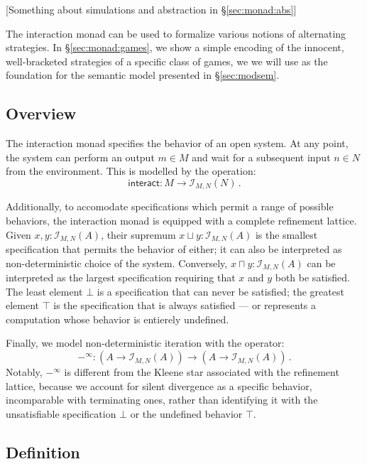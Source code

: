 \documentclass[acmsmall,timestamp,review]{acmart}
\newcommand{\kw}[1]{\ensuremath{ \mathsf{#1} }}
\begin{document}
[Something about simulations and abstraction in \S\ref{sec:monad:abs}]

The interaction monad
can be used to formalize various notions of alternating strategies.
In \S\ref{sec:monad:games},
we show a simple encoding of the
innocent, well-bracketed strategies
of a specific class of games,
we we will use as the foundation for
the semantic model presented in \S\ref{sec:modsem}.


\subsection{Overview} \label{sec:monad:overview} %

The interaction monad specifies
the behavior of an open system.
At any point,
the system can perform an output $m \in M$ and
wait for a subsequent input $n \in N$ from the environment.
This is modelled by the operation:
\[
    \kw{interact} : M \rightarrow \mathcal{I}_{M,N}(N) \,.
\]

Additionally,
to accomodate specifications which permit a range of possible behaviors,
the interaction monad is equipped with a complete refinement lattice.
Given $x, y : \mathcal{I}_{M,N}(A)$,
their supremum $x \sqcup y : \mathcal{I}_{M,N}(A)$
is the smallest specification that permits the behavior of either;
it can also be interpreted as non-deterministic choice
of the system.
Conversely, $x \sqcap y : \mathcal{I}_{M,N}(A)$ can be interpreted as
the largest specification requiring that $x$ and $y$ both be satisfied.
The least element $\bot$
is a specification that can never be satisfied;
the greatest element $\top$
is the specification that is always satisfied ---
or represents a computation whose behavior is entierely undefined.

Finally,
we model non-deterministic iteration with the operator:
\[
     -^\infty : (A \rightarrow \mathcal{I}_{M,N}(A)) \rightarrow
                (A \rightarrow \mathcal{I}_{M,N}(A)) \,.
\]
Notably,
$-^\infty$ is different from
the Kleene star associated with the refinement lattice,
because we account for silent divergence as a specific behavior,
incomparable with terminating ones,
rather than identifying it with
the unsatisfiable specification $\bot$
or the undefined behavior $\top$.


\subsection{Definition} \label{sec:monad:def} %
\end{document}
